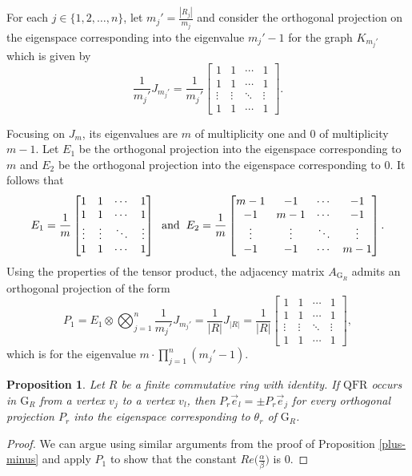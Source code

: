 \documentclass[12pt]{amsart}
\numberwithin{equation}{section}
\newtheorem{prop}[thm]{Proposition}
\theoremstyle{definition}
\theoremstyle{definition} \numberwithin{equation}{section}
\newcommand{\G}{\mathrm{G}}
\newcommand{\QFR}{\mathrm{QFR}}
\begin{document}
For each $j \in \{1,2,\ldots,n\}$, let $m_j' = \frac{|R_j|}{m_j}$ and consider the orthogonal projection on the eigenspace corresponding into the eigenvalue $m_j' - 1$ for the graph $K_{m_j'}$ which is given by 
$$
\frac{1}{m_j'} J_{m_j'} =
\frac{1}{m_j'}\begin{bmatrix}
        1 & 1& \cdots &1\\
        1 & 1& \cdots &1 \\
\vdots&\vdots&\ddots&\vdots\\
        1 & 1& \cdots &1
    \end{bmatrix}.
$$

Focusing on $J_m$, its eigenvalues are $m$ of multiplicity one and $0$ of multiplicity $m - 1$. Let $E_1$ be the orthogonal projection into the eigenspace corresponding to $m$ and $E_2$ be the orthogonal projection into the eigenspace corresponding to $0$. It follows that
\begin{equation*}
    E_1 = \frac{1}{m}\begin{bmatrix}
        1 & 1& \cdots &1\\
        1 & 1& \cdots &1 \\
        \vdots&\vdots&\ddots&\vdots\\
        1 & 1& \cdots &1
    \end{bmatrix} \hspace{2mm} \text{and} \hspace{2mm} E_2 = \frac{1}{m}\begin{bmatrix}
        m-1 & -1  & \cdots & -1\\
        -1 & m-1 & \cdots & -1\\
        \vdots & \vdots & \ddots &\vdots\\
        -1 & -1 & \cdots& m-1
    \end{bmatrix}.
\end{equation*}
Using the properties of the tensor product, the adjacency matrix $A_{\G_R}$ admits an orthogonal projection of the form 
\[
P_1 = E_1 \otimes \bigotimes_{j = 1}^n \frac{1}{m_j'} J_{m_j'} =
\frac{1}{|R|}J_{|R|} = 
\frac{1}{|R|}\begin{bmatrix}
        1 & 1& \cdots &1\\
        1 & 1& \cdots &1 \\
\vdots&\vdots&\ddots&\vdots\\
        1 & 1& \cdots &1
    \end{bmatrix}, 
\]
which is for the eigenvalue $m \cdot \prod_{j = 1} ^n (m_j' - 1)$.

\begin{prop}
 \label{plus-minus commu}
    Let $R$ be a finite commutative ring with identity. If $\QFR$ occurs in $\G_R$ from a vertex $v_j$ to a vertex $v_l$, then $P_r \vec{e}_l = \pm P_r \vec{e}_j$ for every orthogonal projection $P_r$ into the eigenspace corresponding to $\theta_r$ of $\G_R$.
\end{prop}
\begin{proof}
We can argue using similar arguments from the proof of Proposition \ref{plus-minus} and apply $P_1$ to show that the constant $Re\big( \frac{\alpha}{\beta}\big)$ is $0$.
\end{proof}
\end{document}
